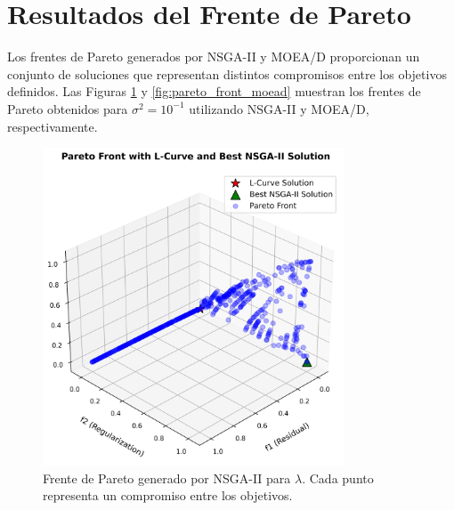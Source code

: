 \section{Resultados del Frente de Pareto} \label{sec:results:pareto}

Los frentes de Pareto generados por NSGA-II y MOEA/D proporcionan un conjunto de soluciones que representan distintos compromisos entre los objetivos definidos. Las Figuras \ref{fig:pareto_front_nsga2} y \ref{fig:pareto_front_moead} muestran los frentes de Pareto obtenidos para \( \sigma^2 = 10^{-1} \) utilizando NSGA-II y MOEA/D, respectivamente.

\begin{figure}[H]
    \centering
    \includegraphics[width=0.8\textwidth]{Images/pareto_front_nsga2.png}
    \caption{Frente de Pareto generado por NSGA-II para \( \lambda \). Cada punto representa un compromiso entre los objetivos.}
    \label{fig:pareto_front_nsga2}
\end{figure}


